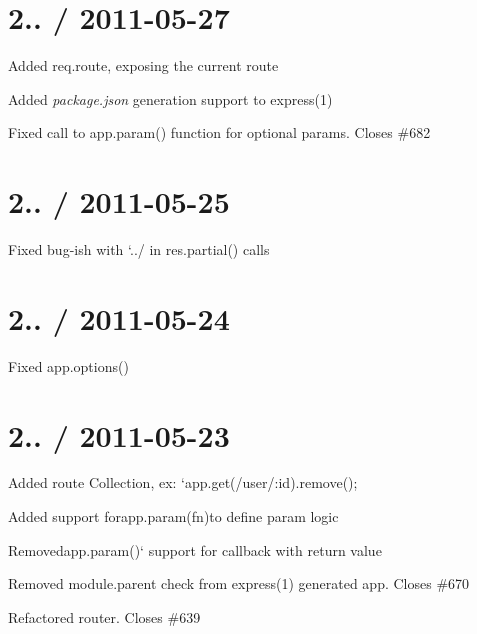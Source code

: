 \section*{2.. / 2011-\/05-\/27 }


\begin{DoxyItemize}
\item Added {\ttfamily req.\+route}, exposing the current route
\item Added {\itshape package.\+json} generation support to {\ttfamily express(1)}
\item Fixed call to {\ttfamily app.\+param()} function for optional params. Closes \#682
\end{DoxyItemize}

\section*{2.. / 2011-\/05-\/25 }


\begin{DoxyItemize}
\item Fixed bug-\/ish with `../\textquotesingle{} in {\ttfamily res.\+partial()} calls
\end{DoxyItemize}

\section*{2.. / 2011-\/05-\/24 }


\begin{DoxyItemize}
\item Fixed {\ttfamily app.\+options()}
\end{DoxyItemize}

\section*{2.. / 2011-\/05-\/23 }


\begin{DoxyItemize}
\item Added route {\ttfamily Collection}, ex\+: `app.get(\textquotesingle{}/user/\+:id\textquotesingle{}).remove();{\ttfamily }
\item {\ttfamily Added support for}app.\+param(fn){\ttfamily to define param logic}
\item {\ttfamily Removed}app.\+param()` support for callback with return value
\item Removed module.\+parent check from express(1) generated app. Closes \#670
\item Refactored router. Closes \#639
\end{DoxyItemize}

